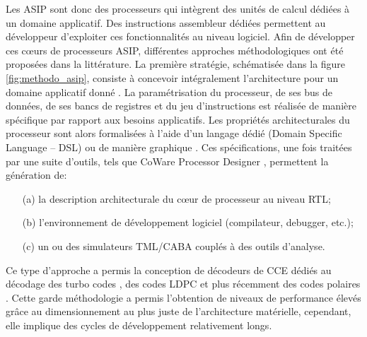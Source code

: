 \documentclass[../main.tex]{subfiles}
\begin{document}
Les ASIP sont donc des processeurs qui intègrent des unités de calcul dédiées à un domaine applicatif. Des instructions assembleur dédiées permettent au développeur d’exploiter ces fonctionnalités au niveau logiciel. Afin de développer ces cœurs de processeurs ASIP, différentes approches méthodologiques ont été proposées dans la littérature. La première stratégie, schématisée dans la figure \ref{fig:methodo_asip}, consiste à concevoir intégralement l’architecture pour un domaine applicatif donné \cite{ASIP:1, ASIP:2}. La paramétrisation du processeur, de ses bus de données, de ses bancs de registres et du jeu d’instructions est réalisée de manière spécifique par rapport aux besoins applicatifs. Les propriétés architecturales du processeur sont alors formalisées à l’aide d’un langage dédié (Domain Specific Language – DSL)  \cite{ASIP:DSL:1,ASIP:DSL:2,ASIP:DSL:3} ou de manière graphique \cite{ASIP:PC:SC}. Ces spécifications, une fois traitées par une suite d’outils, tels que CoWare Processor Designer \cite{Coware:1,Coware:2}, permettent la génération de:
\begin{itemize}
    \item[(a)] la description architecturale du cœur de processeur au niveau RTL;
    \item[(b)] l’environnement de développement logiciel (compilateur, debugger, etc.);
    \item[(c)] un ou des simulateurs TML/CABA couplés à des outils d’analyse.
\end{itemize}

Ce type d’approche a permis la conception de décodeurs de CCE dédiés au décodage des turbo codes \cite{Ref_FlexFEC}, des codes LDPC \cite{Ref_Flexichap} et plus récemment des codes polaires \cite{ASIP:PC:SC}. Cette garde méthodologie a permis l’obtention de niveaux de performance élevés grâce au dimensionnement au plus juste de l’architecture matérielle, cependant, elle implique des cycles de développement relativement longs.
\end{document}
